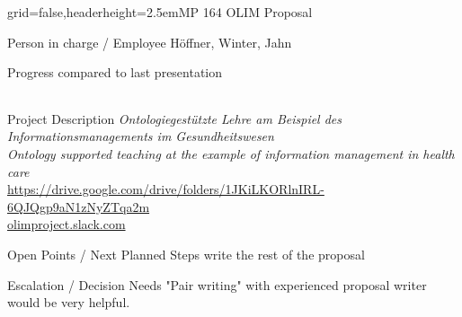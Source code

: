 \documentclass[english]{kiesgrube}
\begin{document}
\begin{poster}{grid=false,headerheight=2.5em}{}{MP 164 OLIM Proposal}{}{}
\begin{posterbox}[name=person,column=0,row=0]{Person in charge / Employee}
Höffner, Winter, Jahn
\end{posterbox}
\begin{posterbox}[name=progress,below=person]{Progress compared to last presentation}
\begin{tabulary}{\textwidth}{lL}
\end{tabulary}
\end{posterbox}
\begin{posterbox}[name=description,column=1,row=0]{Project Description}
\emph{Ontologiegestützte Lehre am Beispiel des Informationsmanagements im Gesundheitswesen}\\
\emph{Ontology supported teaching at the example of information management in health care}\\
\url{https://drive.google.com/drive/folders/1JKiLKORlnIRL-6QJQgp9aN1zNyZTqa2m}\\
\url{olimproject.slack.com}
\end{posterbox}
\begin{posterbox}[name=open,column=1,below=description]{Open Points / Next Planned Steps}
write the rest of the proposal
\end{posterbox}
\iffalse
\begin{posterbox}[name=escalation,column=1,below=open]{Escalation / Decision Needs}
"Pair writing" with experienced proposal writer would be very helpful.
\end{posterbox}

\end{poster}
\end{document}
